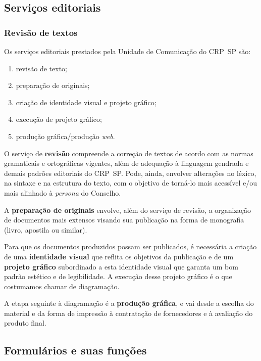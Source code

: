 \subsection{Serviços editoriais}

\subsubsection{Revisão de textos}

Os serviços editoriais prestados pela Unidade de Comunicação do CRP~SP
são:

\begin{enumerate}

  \item
        revisão de texto;
  \item
        preparação de originais;
  \item
        criação de identidade visual e projeto gráfico;
  \item
        execução de projeto gráfico;
  \item
        produção gráfica/produção \emph{web}.
\end{enumerate}

O serviço de \textbf{revisão} compreende a correção de textos de acordo
com as normas gramaticais e ortográficas vigentes, além de adequação à
linguagem gendrada e demais padrões editoriais do CRP~SP. Pode, ainda,
envolver alterações no léxico, na sintaxe e na estrutura do texto, com o
objetivo de torná-lo mais acessível e/ou mais alinhado à \emph{persona}
do Conselho.

A \textbf{preparação de originais} envolve, além do serviço de revisão,
a organização de documentos mais extensos visando sua publicação na
forma de monografia (livro, apostila ou similar).

Para que os documentos produzidos possam ser publicados, é necessária a
criação de uma \textbf{identidade visual} que reflita os objetivos da
publicação e de um \textbf{projeto gráfico} subordinado a esta
identidade visual que garanta um bom padrão estético e de legibilidade.
A execução desse projeto gráfico é o que costumamos chamar de
diagramação.

A etapa seguinte à diagramação é a \textbf{produção gráfica}, e vai
desde a escolha do material e da forma de impressão à contratação de
fornecedores e à avaliação do produto final.

\subsection{Formulários e suas
  funções}

